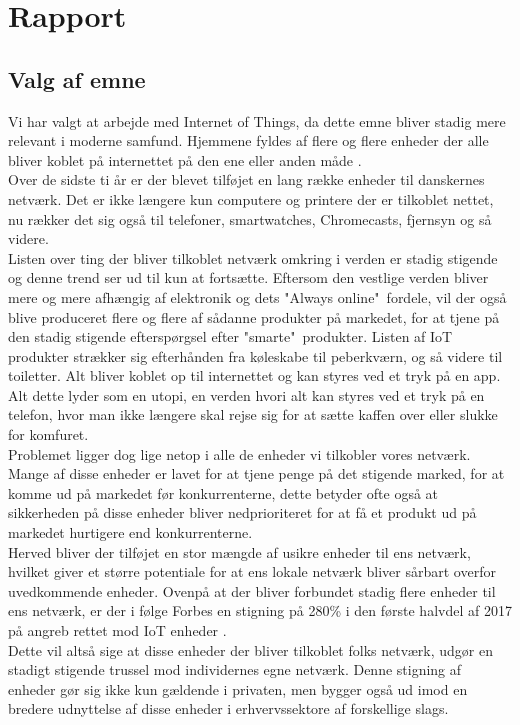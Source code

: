 
\chapter{Rapport}

    \section{Valg af emne}
    
    Vi har valgt at arbejde med Internet of Things, da dette emne bliver stadig mere relevant i moderne samfund. Hjemmene fyldes af flere og flere enheder der alle bliver koblet på internettet på den ene eller anden måde \autocite{website:Statistica2015}.\\
    Over de sidste ti år er der blevet tilføjet en lang række enheder til danskernes netværk. Det er ikke længere kun computere og printere der er tilkoblet nettet, nu rækker det sig også til telefoner, smartwatches, Chromecasts, fjernsyn og så videre. \\ 
    Listen over ting der bliver tilkoblet netværk omkring i verden er stadig stigende og denne trend ser ud til kun at fortsætte. Eftersom den vestlige verden bliver mere og mere afhængig af elektronik og dets "Always online"\ fordele, vil der også blive produceret flere og flere af sådanne produkter på markedet, for at tjene på den stadig stigende efterspørgsel efter "smarte"\ produkter. Listen af IoT produkter strækker sig efterhånden fra køleskabe til peberkværn, og så videre til toiletter. Alt bliver koblet op til internettet og kan styres ved et tryk på en app. Alt dette lyder som en utopi, en verden hvori alt kan styres ved et tryk på en telefon, hvor man ikke længere skal rejse sig for at sætte kaffen over eller slukke for komfuret.\\
    Problemet ligger dog lige netop i alle de enheder vi tilkobler vores netværk. Mange af disse enheder er lavet for at tjene penge på det stigende marked, for at komme ud på markedet før konkurrenterne, dette betyder ofte også at sikkerheden på disse enheder bliver nedprioriteret for at få et produkt ud på markedet hurtigere end konkurrenterne.\\
    Herved bliver der tilføjet en stor mængde af usikre enheder til ens netværk, hvilket giver et større potentiale for at ens lokale netværk bliver sårbart overfor uvedkommende enheder. Ovenpå at der bliver forbundet stadig flere enheder til ens netværk, er der i følge Forbes en stigning på 280\% i den første halvdel af 2017 på angreb rettet mod IoT enheder \autocite{Forbes2018}.\\
    Dette vil altså sige at disse enheder der bliver tilkoblet folks netværk, udgør en stadigt stigende trussel mod individernes egne netværk. Denne stigning af enheder gør sig ikke kun gældende i privaten, men bygger også ud imod en bredere udnyttelse af disse enheder i erhvervssektore af forskellige slags.
    
